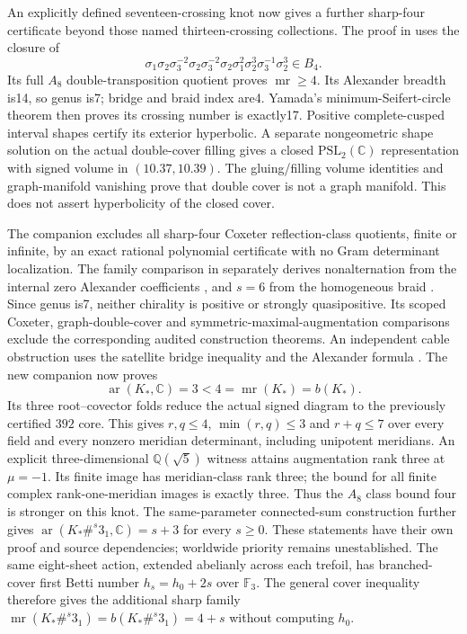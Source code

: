 \documentclass[11pt]{article}
\newcommand{\mr}{\operatorname{mr}}
\begin{document}
An explicitly defined seventeen-crossing knot now gives a further
sharp-four certificate beyond those named thirteen-crossing collections.
The proof in  uses the closure of
\[
 \sigma_1\sigma_2\sigma_3^{-2}\sigma_2\sigma_3^{-2}
 \sigma_2\sigma_1^2\sigma_2^3\sigma_3^{-1}\sigma_2^3\in B_4.
\]
Its full $A_8$ double-transposition quotient proves $\mr\ge4$.
Its Alexander breadth is14, so genus is7; bridge and braid index are4.
Yamada's minimum-Seifert-circle theorem \cite{yamada} then proves its
crossing number is exactly17. Positive complete-cusped interval shapes
certify its exterior hyperbolic. A separate nongeometric shape solution
on the actual double-cover filling gives a closed
$\mathrm{PSL}_2(\mathbb C)$ representation with signed volume in
$(10.37,10.39)$. The gluing/filling volume identities \cite{franc}
and graph-manifold vanishing \cite{lty} prove that double cover is
not a graph manifold. This does not assert hyperbolicity of the closed cover.

The companion  excludes
all sharp-four Coxeter reflection-class quotients, finite or infinite,
by an exact rational polynomial certificate with no Gram determinant
localization. The family comparison in
 separately derives
nonalternation from the internal zero Alexander coefficients
\cite{murasugi}, and $s=6$ from the homogeneous braid \cite{abe}.
Since genus is7, neither chirality is positive or strongly quasipositive.
Its scoped Coxeter, graph-double-cover and symmetric-maximal-augmentation
comparisons exclude the corresponding audited construction theorems.
An independent cable obstruction uses the satellite bridge inequality
and the Alexander formula \cite{schultens,lm}.
The new companion  now proves
\[
 \operatorname{ar}(K_*,\mathbb C)=3<4=\mr(K_*)=b(K_*).
\]
Its three root--covector folds reduce the actual signed diagram to the
previously certified $392$ core. This gives $r,q\le4$,
$\min(r,q)\le3$ and $r+q\le7$ over every field and every nonzero
meridian determinant, including unipotent meridians. An explicit
three-dimensional $\mathbb Q(\sqrt5)$ witness attains augmentation
rank three at $\mu=-1$. Its finite image has meridian-class rank three;
the bound for all finite complex rank-one-meridian images is exactly
three. Thus the $A_8$ class bound four is stronger on this knot.
The same-parameter connected-sum construction further gives
$\operatorname{ar}(K_*\#^s3_1,\mathbb C)=s+3$ for every $s\ge0$.
These statements have their own proof and source dependencies;
worldwide priority remains unestablished.
The same eight-sheet action, extended abelianly across each trefoil,
has branched-cover first Betti number $h_s=h_0+2s$ over $\mathbb F_3$.
The general cover inequality therefore gives the additional sharp family
$\mr(K_*\#^s3_1)=b(K_*\#^s3_1)=4+s$ without computing $h_0$.
\end{document}
